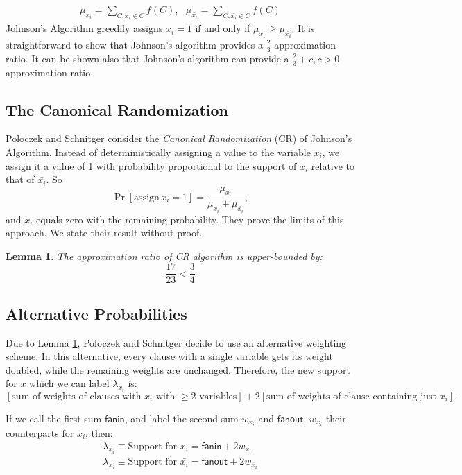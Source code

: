 \documentclass[11pt,letter]{article}
\newtheorem{lemma}[theorem]{Lemma}
\numberwithin{theorem}{section}
\begin{document}
\begin{align*}
\mu_{x_i} = \sum_{C,x_i \in C}f(C), \,\,\,\, \mu_{\bar{x_i}} =\sum_{C,\bar{x_i}\in C}f(C)
\end{align*}
Johnson's Algorithm greedily assigns $x_i =1$ if and only if $\mu_{x_1} \ge \mu_{\bar{x_i}}$. It is straightforward to show that Johnson's algorithm provides a $\frac{2}{3}$ approximation ratio. It can be shown also that Johnson's algorithm can provide a $\frac{2}{3} + c, c>0$ approximation ratio.

\subsection*{The Canonical Randomization}
Poloczek and Schnitger consider the \emph{Canonical Randomization} (CR) of Johnson's Algorithm. Instead of deterministically assigning a value to the variable $x_i$, we assign it a value of 1 with probability proportional to the support of $x_i$ relative to that of $\bar{x_i}$. So
\[\Pr[\mathrm{assign }\, x_i=1] = \frac{\mu_{x_i}}{\mu_{x_i} + \mu_{\bar{x_i}}},\] and $x_i$ equals zero with the remaining probability. They prove the limits of this approach. We state their result without proof.

\begin{lemma}
\label{L:1}
The approximation ratio of CR algorithm is upper-bounded by:
$$\frac{17}{23} < \frac{3}{4}$$

\end{lemma}

\subsection*{Alternative Probabilities}
Due to Lemma \ref{L:1}, Poloczek and Schnitger decide to use an alternative weighting scheme. In this alternative, every clause with a single variable gets its weight doubled, while the remaining weights are unchanged. Therefore, the new support for $x$ which we can label $\lambda_{x_i}$ is:
\[[\textrm{sum of weights of clauses with }x_i\textrm{ with }\ge 2\textrm{ variables}] + 2[\textrm{sum of weights of clause containing just }x_i].\]

If we call the first sum $\mathsf{fanin}$, and label the second sum $w_{x_i}$ and $\mathsf{fanout}$, $w_{\bar{x_i}}$ their counterparts for $\bar{x_i}$, then:
\begin{eqnarray*}
\lambda_{x_i} \equiv \textrm{Support for } x_i = \mathsf{fanin} + 2w_{x_i}\\
\lambda_{\bar{x_i}} \equiv \textrm{Support for } \bar{x_i} = \mathsf{fanout} + 2w_{\bar{x_i}}
\end{eqnarray*}
\end{document}
